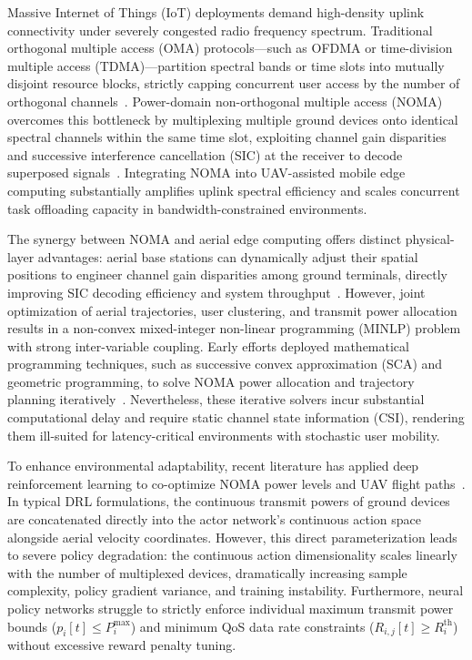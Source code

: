 \documentclass[journal]{IEEEtran}
\begin{document}
Massive Internet of Things (IoT) deployments demand high-density uplink connectivity under severely congested radio frequency spectrum. Traditional orthogonal multiple access (OMA) protocols---such as OFDMA or time-division multiple access (TDMA)---partition spectral bands or time slots into mutually disjoint resource blocks, strictly capping concurrent user access by the number of orthogonal channels~\cite{11020655, zeng2019accessing}. Power-domain non-orthogonal multiple access (NOMA) overcomes this bottleneck by multiplexing multiple ground devices onto identical spectral channels within the same time slot, exploiting channel gain disparities and successive interference cancellation (SIC) at the receiver to decode superposed signals~\cite{11020655, 10697399}. Integrating NOMA into UAV-assisted mobile edge computing substantially amplifies uplink spectral efficiency and scales concurrent task offloading capacity in bandwidth-constrained environments.

The synergy between NOMA and aerial edge computing offers distinct physical-layer advantages: aerial base stations can dynamically adjust their spatial positions to engineer channel gain disparities among ground terminals, directly improving SIC decoding efficiency and system throughput~\cite{qin2024drl, 11020655}. However, joint optimization of aerial trajectories, user clustering, and transmit power allocation results in a non-convex mixed-integer non-linear programming (MINLP) problem with strong inter-variable coupling. Early efforts deployed mathematical programming techniques, such as successive convex approximation (SCA) and geometric programming, to solve NOMA power allocation and trajectory planning iteratively~\cite{qin2024drl}. Nevertheless, these iterative solvers incur substantial computational delay and require static channel state information (CSI), rendering them ill-suited for latency-critical environments with stochastic user mobility.

To enhance environmental adaptability, recent literature has applied deep reinforcement learning to co-optimize NOMA power levels and UAV flight paths~\cite{qin2024drl, 10697399}. In typical DRL formulations, the continuous transmit powers of ground devices are concatenated directly into the actor network's continuous action space alongside aerial velocity coordinates. However, this direct parameterization leads to severe policy degradation: the continuous action dimensionality scales linearly with the number of multiplexed devices, dramatically increasing sample complexity, policy gradient variance, and training instability. Furthermore, neural policy networks struggle to strictly enforce individual maximum transmit power bounds ($p_i[t] \le P_i^{\max}$) and minimum QoS data rate constraints ($R_{i,j}[t] \ge R_i^{\mathrm{th}}$) without excessive reward penalty tuning.
\end{document}
